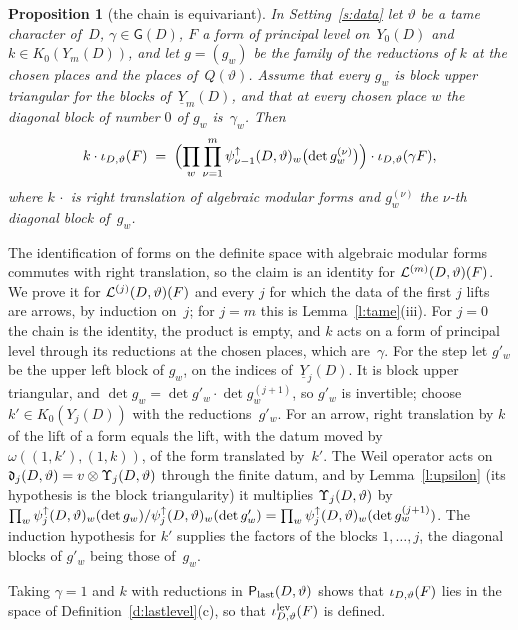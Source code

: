 \documentclass[11pt,a4paper]{article}
\makeatletter
\newcommand{\lean}[1]{\csname LN@#1\endcsname}
\newcommand{\m}[1]{\mbox{$#1$}}        %
\newcommand{\leantag}{{\sffamily\bfseries\fontsize{6.3}{8}\selectfont\color{leancol}\addfontfeatures{LetterSpace=7}LEAN}}
\newcommand{\leanline}[1]{\par\nopagebreak\vspace{-2.5pt}{\fontsize{8.9}{12.4}\selectfont\color{inksoft}\raggedright
  \noindent\llap{\leantag\hspace{9pt}}#1\par}\vspace{1pt}}
\theoremstyle{plainx}
\newtheorem{proposition}[theorem]{Proposition}
\theoremstyle{uprightx}
\renewenvironment{proof}[1][Proof]{\par\pushQED{\qed}\normalfont\topsep0pt\partopsep0pt
  \trivlist\item[\hskip\labelsep\itshape #1.]\ignorespaces}{\popQED\endtrivlist\@endpefalse}
\newcommand{\tensor}{\otimes}
\newcommand{\YI}[2]{\underline{Y}_{#2}(#1)}        %
\newcommand{\Ys}[2]{Y_{#2}(#1)}                    %
\newcommand{\GD}[1]{\mathsf{G}(#1)}                %
\newcommand{\Qs}[1]{Q(#1)}                         %
\newcommand{\Kz}[1]{K_0(#1)}                       %
\makeatother
\begin{document}
\begin{proposition}[the chain is equivariant]\label{p:equiv}
In Setting~\ref{s:data} let $\vartheta$ be a tame character of~$D$, \m{\gamma\in\GD{D}}, $F$ a form of principal
level on~$\Ys{D}{0}$ and \m{k\in\Kz{\Ys{D}{m}}}, and let \m{g=(g_w)} be the family of the reductions of $k$ at the
chosen places and the places of~$\Qs{\vartheta}$. Assume that every $g_w$ is block upper triangular for the blocks
of~$\YI{D}{m}$, and that at every chosen place $w$ the diagonal block of number $0$ of $g_w$ is~$\gamma_w$. Then
\[k\cdot\iota_{D,\vartheta}(F)\;=\;\Bigl(\prod_{w}\prod_{\nu=1}^{m}\psi^{\uparrow}_{\nu-1}(D,\vartheta)_w\bigl(\det g_w^{(\nu)}\bigr)\Bigr)\cdot\iota_{D,\vartheta}(\gamma F),\]
where \m{k\,\cdot} is right translation of algebraic modular forms and $g_w^{(\nu)}$ the $\nu$-th diagonal block
of~$g_w$.
\end{proposition}
\begin{proof}
The identification of forms on the definite space with algebraic modular forms commutes with right translation,
so the claim is an identity for $\mathcal{L}^{(m)}(D,\vartheta)(F)$. We prove it for $\mathcal{L}^{(j)}(D,\vartheta)(F)$ and
every $j$ for which the data of the first $j$ lifts are arrows, by induction on~$j$; for \m{j=m} this is
Lemma~\ref{l:tame}(iii). For \m{j=0} the chain is the identity, the product is empty, and $k$ acts on a form of
principal level through its reductions at the chosen places, which are~$\gamma$. For the step let $g'_w$ be the
upper left block of $g_w$, on the indices of~$\YI{D}{j}$. It is block upper triangular, and
$\det g_w=\det g'_w\cdot\det g^{(j+1)}_w$, so $g'_w$ is invertible; choose \m{k'\in\Kz{\Ys{D}{j}}} with the
reductions~$g'_w$. For an arrow, right translation by $k$ of the lift of a form equals the lift, with the datum
moved by \m{\omega((1,k'),(1,k))}, of the form translated by~$k'$. The Weil operator acts on
$\datY{\vartheta}{j}=v\tensor\ups{\vartheta}{j}$ through the finite datum, and by Lemma~\ref{l:upsilon} (its
hypothesis is the block triangularity) it multiplies \m{\ups{\vartheta}{j}} by
$\prod_w\psi^{\uparrow}_{j}(D,\vartheta)_w(\det g_w)/\psi^{\uparrow}_{j}(D,\vartheta)_w(\det g'_w)=\prod_w\psi^{\uparrow}_{j}(D,\vartheta)_w(\det g^{(j+1)}_w)$.
The induction hypothesis for $k'$ supplies the factors of the blocks \m{1,\dots,j}, the diagonal blocks of $g'_w$
being those of~$g_w$.
\end{proof}
\leanline{\lean{algFormRepiota}}

Taking \m{\gamma=1} and $k$ with reductions in \m{\lastRes{\vartheta}} shows that \m{\iot{\vartheta}(F)} lies in the
space of Definition~\ref{d:lastlevel}(c), so that \m{\iotL{\vartheta}{(F)}} is defined.
\end{document}

